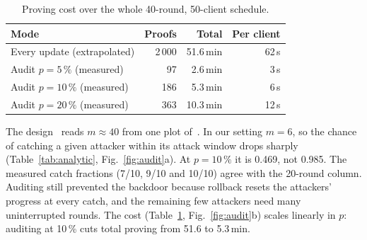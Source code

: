 \documentclass[conference]{IEEEtran}
\begin{document}
\begin{table}[t]
\centering\footnotesize\caption{Proving cost over the whole 40-round, 50-client schedule.}\label{tab:cost}
\setlength{\tabcolsep}{3pt}
\begin{tabular}{@{}lrrr@{}}
\toprule
Mode & Proofs & Total & Per client\\\midrule
Every update (extrapolated) & 2\,000 & 51.6\,min & 62\,s\\
Audit $p=5\,\%$ (measured) & 97 & 2.6\,min & 3\,s\\
Audit $p=10\,\%$ (measured) & 186 & 5.3\,min & 6\,s\\
Audit $p=20\,\%$ (measured) & 363 & 10.3\,min & 12\,s\\\bottomrule
\end{tabular}
\end{table}

The design~\cite{zkdesign} reads $m\approx40$ from one plot of~\cite{fusion}. In our setting $m=6$,
so the chance of catching a given attacker within its attack window drops sharply
(Table~\ref{tab:analytic}, Fig.~\ref{fig:audit}a). At $p=10\,\%$ it is 0.469, not 0.985. The
measured catch fractions (7/10, 9/10 and 10/10) agree with the 20-round column. Auditing still
prevented the backdoor because rollback resets the attackers' progress at every catch, and the
remaining few attackers need many uninterrupted rounds. The cost (Table~\ref{tab:cost},
Fig.~\ref{fig:audit}b) scales linearly in $p$: auditing at 10\,\% cuts total proving from 51.6 to
5.3\,min.
\end{document}
